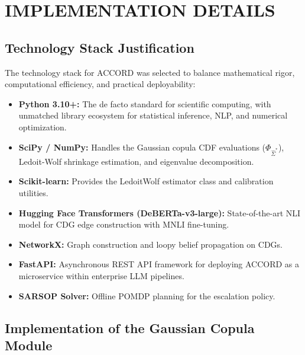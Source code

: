 \documentclass[12pt,a4paper]{report}
\begin{document}
\chapter{IMPLEMENTATION DETAILS}

\section{Technology Stack Justification}

The technology stack for ACCORD was selected to balance mathematical rigor, computational efficiency, and practical deployability:

\begin{itemize}
    \item \textbf{Python 3.10+:} The de facto standard for scientific computing, with unmatched library ecosystem for statistical inference, NLP, and numerical optimization.
    \item \textbf{SciPy / NumPy:} Handles the Gaussian copula CDF evaluations ($\Phi_{\hat{\Sigma}^*}$), Ledoit-Wolf shrinkage estimation, and eigenvalue decomposition.
    \item \textbf{Scikit-learn:} Provides the LedoitWolf estimator class and calibration utilities.
    \item \textbf{Hugging Face Transformers (DeBERTa-v3-large):} State-of-the-art NLI model for CDG edge construction with MNLI fine-tuning.
    \item \textbf{NetworkX:} Graph construction and loopy belief propagation on CDGs.
    \item \textbf{FastAPI:} Asynchronous REST API framework for deploying ACCORD as a microservice within enterprise LLM pipelines.
    \item \textbf{SARSOP Solver:} Offline POMDP planning for the escalation policy.
\end{itemize}

\section{Implementation of the Gaussian Copula Module}
\end{document}
